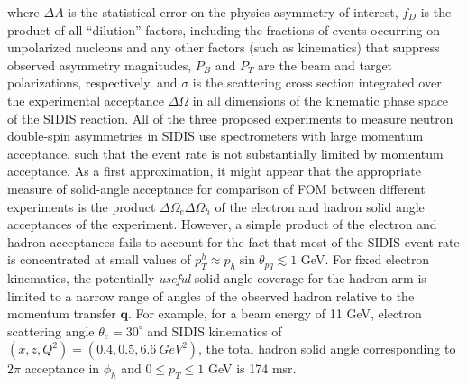 where $\Delta A$ is the statistical error on the physics asymmetry of interest, $f_D$ is the product of all ``dilution'' factors, including the fractions of events occurring on unpolarized nucleons and any other factors (such as kinematics) that suppress observed asymmetry magnitudes, $P_B$ and $P_T$ are the beam and target polarizations, respectively, and $\sigma$ is the scattering cross section integrated over the experimental acceptance $\Delta \Omega$ in all dimensions of the kinematic phase space of the SIDIS reaction. All of the three proposed experiments to measure neutron double-spin asymmetries in SIDIS use spectrometers with large momentum acceptance, such that the event rate is not substantially limited by momentum acceptance. As a first approximation, it might appear that the appropriate measure of solid-angle acceptance for comparison of FOM between different experiments is the product $\Delta \Omega_e \Delta \Omega_h$ of the electron and hadron solid angle acceptances of the experiment. However, a simple product of the electron and hadron acceptances fails to account for the fact that most of the SIDIS event rate is concentrated at small values of $p_T^h \approx p_h \sin \theta_{pq} \lesssim 1$ GeV. For fixed electron kinematics, the potentially \emph{useful} solid angle coverage for the hadron arm is limited to a narrow range of angles of the observed hadron relative to the momentum transfer $\mathbf{q}$. For example, for a beam energy of 11 GeV, electron scattering angle $\theta_e = 30^\circ$ and SIDIS kinematics of $(x,z,Q^2)=(0.4,0.5,6.6\ GeV^2)$, the total hadron solid angle corresponding to $2\pi$ acceptance in $\phi_h$ and $0 \le p_T \le 1$ GeV is 174 msr. 

